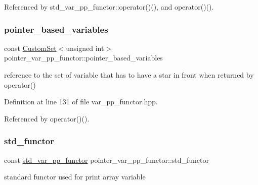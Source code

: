 Referenced by std\+\_\+var\+\_\+pp\+\_\+functor\+::operator()(), and operator()().

\mbox{\label{structpointer__var__pp__functor_a96609ad745aa13d17744abba4373a059}} 
\subsubsection{\texorpdfstring{pointer\+\_\+based\+\_\+variables}{pointer\_based\_variables}}
{\footnotesize\ttfamily const \hyperlink{custom__set_8hpp_a615bc2f42fc38a4bb1790d12c759e86f}{Custom\+Set}$<$unsigned int$>$ pointer\+\_\+var\+\_\+pp\+\_\+functor\+::pointer\+\_\+based\+\_\+variables\hspace{0.3cm}{\ttfamily [private]}}



reference to the set of variable that has to have a star in front when returned by operator() 



Definition at line 131 of file var\+\_\+pp\+\_\+functor.\+hpp.



Referenced by operator()().

\mbox{\label{structpointer__var__pp__functor_a808812fcbc81aefcf8c379faaff4184e}} 
\subsubsection{\texorpdfstring{std\+\_\+functor}{std\_functor}}
{\footnotesize\ttfamily const \hyperlink{structstd__var__pp__functor}{std\+\_\+var\+\_\+pp\+\_\+functor} pointer\+\_\+var\+\_\+pp\+\_\+functor\+::std\+\_\+functor\hspace{0.3cm}{\ttfamily [private]}}



standard functor used for print array variable 



